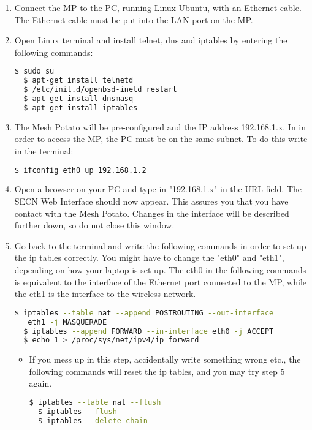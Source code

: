 \begin{enumerate}
\item Connect the MP to the PC, running Linux Ubuntu, with an Ethernet cable. The Ethernet cable must be put into the LAN-port on the MP. 

\item Open Linux terminal and install telnet, dns and iptables by entering the following commands: 
\noindent
\begin{lstlisting}[language=bash]
  $ sudo su
  $ apt-get install telnetd
  $ /etc/init.d/openbsd-inetd restart 
  $ apt-get install dnsmasq
  $ apt-get install iptables
\end{lstlisting}

\item The Mesh Potato will be pre-configured and the IP address 192.168.1.x. In in order to access the MP, the PC must be on the same subnet. To do this write in the terminal: 
\noindent
\begin{lstlisting}[language=bash]
  $ ifconfig eth0 up 192.168.1.2
\end{lstlisting}

\item Open a browser on your PC and type in "192.168.1.x" in the URL field. The SECN Web Interface should now appear. This assures you that you have contact with the Mesh Potato. Changes in the interface will be described further down, so do not close this window.  

\item Go back to the terminal and write the following commands in order to set up the ip tables correctly. You might have to change the "eth0" and "eth1", depending on how your laptop is set up. The eth0 in the following commands is equivalent to the interface of the Ethernet port connected to the MP, while the eth1 is the interface to the wireless network. 
\noindent
\begin{lstlisting}[language=bash]
  $ iptables --table nat --append POSTROUTING --out-interface
   eth1 -j MASQUERADE
  $ iptables --append FORWARD --in-interface eth0 -j ACCEPT
  $ echo 1 > /proc/sys/net/ipv4/ip_forward
\end{lstlisting} 
\begin{itemize}
\item If you mess up in this step, accidentally write something wrong etc., the following commands will reset the ip tables, and you may try step 5 again.
\noindent
\begin{lstlisting}[language=bash]
  $ iptables --table nat --flush
  $ iptables --flush
  $ iptables --delete-chain
\end{lstlisting}
\end{itemize}  


\end{enumerate}
